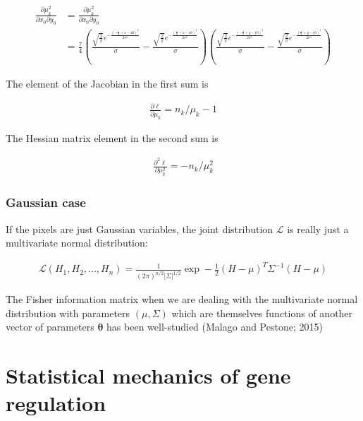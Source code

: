 \documentclass{ucetd}
\begin{document}
\begin{align*}
\frac{\partial \mu_{k}^{2}}{\partial x_{0}\partial y_{0}} &= \frac{\partial \mu_{k}^{2}}{\partial x_{0}\partial y_{0}} \\
&= \frac{\tau}{4}\left(\frac{\sqrt{\frac{2}{\pi }} e^{-\frac{\left(-\frac{a}{2}+x-\text{x0}\right)^2}{2 \sigma ^2}}}{\sigma }-\frac{\sqrt{\frac{2}{\pi }} e^{-\frac{\left(\frac{a}{2}+x-\text{x0}\right)^2}{2 \sigma ^2}}}{\sigma }\right) \left(\frac{\sqrt{\frac{2}{\pi }} e^{-\frac{\left(-\frac{a}{2}+y-\text{y0}\right)^2}{2 \sigma ^2}}}{\sigma }-\frac{\sqrt{\frac{2}{\pi }} e^{-\frac{\left(\frac{a}{2}+y-\text{y0}\right)^2}{2 \sigma ^2}}}{\sigma }\right)
\end{align*}

The element of the Jacobian in the first sum is

\begin{align*}
\frac{\partial\ell}{\partial\mu_{k}} = n_{k}/\mu_{k} - 1
\end{align*}


The Hessian matrix element in the second sum is

\begin{align*}
\frac{\partial^{2}\ell}{\partial\mu_{k}^{2}} = -n_{k}/\mu_{k}^{2} 
\end{align*}


\subsection{Gaussian case}
If the pixels are just Gaussian variables, the joint distribution $\mathcal{L}$ is really just a multivariate normal distribution:

\begin{align*}
\mathcal{L}(H_{1},H_{2},...,H_{n}) = \frac{1}{(2\pi)^{n/2}|\Sigma|^{1/2}}\exp-\frac{1}{2}(H-\mu)^{T}\Sigma^{-1}(H-\mu)
\end{align*}

The Fisher information matrix when we are dealing with the multivariate normal distribution with parameters $(\mu,\Sigma)$ which are themselves functions of another vector of parameters $\bm{\theta}$ has been well-studied (Malago and Pestone; 2015)









\chapter{Statistical mechanics of gene regulation}
\end{document}
